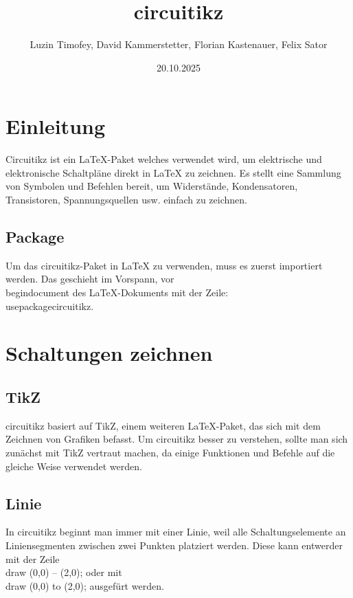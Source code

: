 \documentclass{article} %
\title{circuitikz} %
\author{Luzin Timofey, David Kammerstetter, Florian Kastenauer, Felix Sator} %
\date{20.10.2025} %
\begin{document}
\maketitle %

\newpage %


\section{Einleitung} %

Circuitikz ist ein LaTeX-Paket welches verwendet wird, um elektrische und elektronische Schaltpläne direkt in LaTeX zu zeichnen. Es stellt eine Sammlung von Symbolen und Befehlen bereit, um Widerstände, Kondensatoren, Transistoren, Spannungsquellen usw. einfach zu zeichnen.

\subsection{Package}
Um das circuitikz-Paket in LaTeX zu verwenden, muss es zuerst importiert werden.
Das geschieht im Vorspann, vor \\begin{document} des LaTeX-Dokuments mit der Zeile: \\usepackage{circuitikz}.

\section{Schaltungen zeichnen}

\subsection{TikZ}
circuitikz basiert auf TikZ, einem weiteren LaTeX-Paket, das sich mit dem Zeichnen von Grafiken befasst. Um circuitikz besser zu verstehen, sollte man sich zunächst mit TikZ vertraut machen, da einige Funktionen und Befehle auf die gleiche Weise verwendet werden.

\subsection{Linie}
In circuitikz beginnt man immer mit einer Linie, weil alle Schaltungselemente an Liniensegmenten zwischen zwei Punkten platziert werden. Diese kann entwerder mit der Zeile \\draw (0,0) -- (2,0); oder mit \\draw (0,0) to (2,0); ausgefürt werden.
\end{document}
